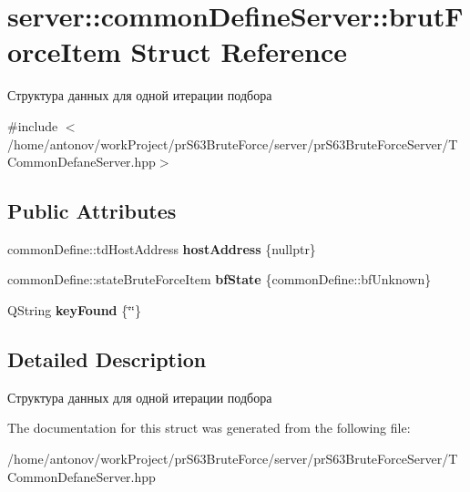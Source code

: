 \hypertarget{structserver_1_1common_define_server_1_1brut_force_item}{}\section{server\+:\+:common\+Define\+Server\+:\+:brut\+Force\+Item Struct Reference}
\label{structserver_1_1common_define_server_1_1brut_force_item}


Структура данных для одной итерации подбора  




{\ttfamily \#include $<$/home/antonov/work\+Project/pr\+S63\+Brute\+Force/server/pr\+S63\+Brute\+Force\+Server/\+T\+Common\+Defane\+Server.\+hpp$>$}

\subsection*{Public Attributes}
\begin{DoxyCompactItemize}
\item 
\mbox{\label{structserver_1_1common_define_server_1_1brut_force_item_ae7533163da44800f12f4018cf3e7548a}} 
common\+Define\+::td\+Host\+Address {\bfseries host\+Address} \{nullptr\}
\item 
\mbox{\label{structserver_1_1common_define_server_1_1brut_force_item_a07b87d05bae6824527d0da789f43c228}} 
common\+Define\+::state\+Brute\+Force\+Item {\bfseries bf\+State} \{common\+Define\+::bf\+Unknown\}
\item 
\mbox{\label{structserver_1_1common_define_server_1_1brut_force_item_a3a446073ee520df43f292bab63d19399}} 
Q\+String {\bfseries key\+Found} \{\char`\"{}\char`\"{}\}
\end{DoxyCompactItemize}


\subsection{Detailed Description}
Структура данных для одной итерации подбора 

The documentation for this struct was generated from the following file\+:\begin{DoxyCompactItemize}
\item 
/home/antonov/work\+Project/pr\+S63\+Brute\+Force/server/pr\+S63\+Brute\+Force\+Server/T\+Common\+Defane\+Server.\+hpp\end{DoxyCompactItemize}
